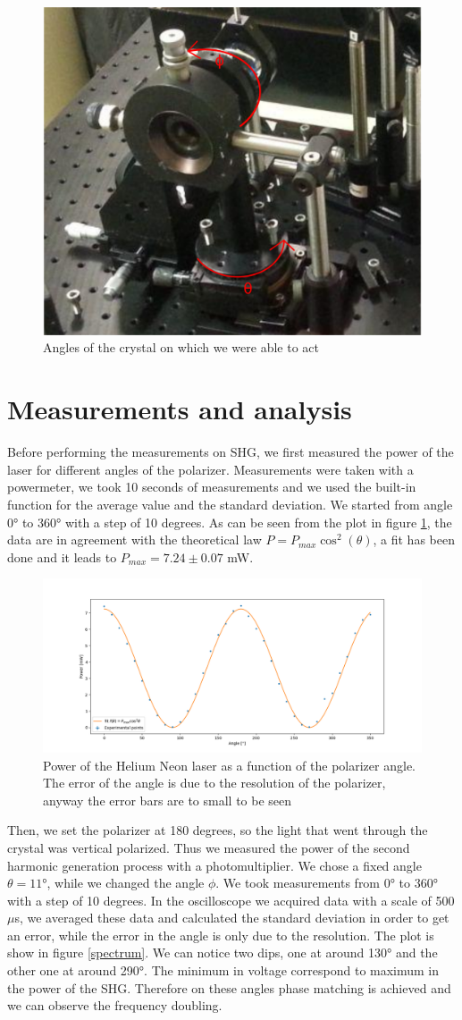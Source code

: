 \documentclass[a4paper,10pt]{article}
\begin{document}
\begin{figure}[H]
\centering
\includegraphics[width = .4\textwidth]{polarizerangle}
\caption{Angles of the crystal on which  we were able to act}
\end{figure} 
\section{Measurements and analysis}
Before performing the measurements on SHG, we first measured the power of the laser for different angles of the polarizer. Measurements were taken with a powermeter, we took 10 seconds of measurements and we used the built-in function for the average value and the standard deviation. We started from angle 0° to 360° with a step of 10 degrees. As can be seen from the plot in figure \ref{polarizer}, the data are in agreement with the theoretical law $P = P_{max}\cos^2(\theta)$, a fit has been done and it leads to $P_{max} = 7.24\pm  0.07$ mW.
\begin{figure}[H]
\centering
\includegraphics[width = \textwidth]{polarization}
\caption{Power of the Helium Neon laser as a function of the polarizer angle. The error of the angle is due to the resolution of the polarizer, anyway the error bars are to small to be seen}
\label{polarizer}
\end{figure}
Then, we set the polarizer at 180 degrees, so the light that went through the crystal was vertical polarized. Thus we measured the power of the second harmonic generation process with a photomultiplier. We chose a fixed angle $\theta = 11$°, while we changed the angle $\phi$. We took measurements from 0° to 360° with a step of 10 degrees. In the oscilloscope we acquired data with a scale of 500 $\mu$s, we averaged these data and calculated the standard deviation in order to get an error, while the error in the angle is only due to the resolution. The plot is show in figure \ref{spectrum}. We can notice two dips, one at around 130° and the other one at around 290°. The minimum in voltage correspond to maximum in the power of the SHG. Therefore on these angles phase matching is achieved and we can observe the frequency doubling.
\end{document}
